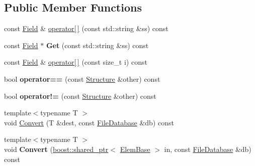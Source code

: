 \subsection*{Public Member Functions}
\begin{DoxyCompactItemize}
\item 
const \hyperlink{struct_assimp_1_1_blender_1_1_field}{Field} \& \hyperlink{class_assimp_1_1_blender_1_1_structure_ada31c77c46ca61b96be67c8c04a357d0}{operator\mbox{[}$\,$\mbox{]}} (const std\+::string \&ss) const 
\item 
\hypertarget{class_assimp_1_1_blender_1_1_structure_a884f54fe4c279088ab5fd2ff7d63a678}{const \hyperlink{struct_assimp_1_1_blender_1_1_field}{Field} $\ast$ {\bfseries Get} (const std\+::string \&ss) const }\label{class_assimp_1_1_blender_1_1_structure_a884f54fe4c279088ab5fd2ff7d63a678}

\item 
const \hyperlink{struct_assimp_1_1_blender_1_1_field}{Field} \& \hyperlink{class_assimp_1_1_blender_1_1_structure_a372b67e8fc1062502b3328b6fb40b91f}{operator\mbox{[}$\,$\mbox{]}} (const size\+\_\+t i) const 
\item 
\hypertarget{class_assimp_1_1_blender_1_1_structure_ad24eabf09c4852b6f46608803f3a1190}{bool {\bfseries operator==} (const \hyperlink{class_assimp_1_1_blender_1_1_structure}{Structure} \&other) const }\label{class_assimp_1_1_blender_1_1_structure_ad24eabf09c4852b6f46608803f3a1190}

\item 
\hypertarget{class_assimp_1_1_blender_1_1_structure_ad1070f2443a9f39c07aff22f46e5d661}{bool {\bfseries operator!=} (const \hyperlink{class_assimp_1_1_blender_1_1_structure}{Structure} \&other) const }\label{class_assimp_1_1_blender_1_1_structure_ad1070f2443a9f39c07aff22f46e5d661}

\item 
{\footnotesize template$<$typename T $>$ }\\void \hyperlink{class_assimp_1_1_blender_1_1_structure_aeb43c388379105fb957bed233acc88dd}{Convert} (T \&dest, const \hyperlink{class_assimp_1_1_blender_1_1_file_database}{File\+Database} \&db) const 
\item 
\hypertarget{class_assimp_1_1_blender_1_1_structure_a5f6d2e880135a00417031588f5340f4f}{{\footnotesize template$<$typename T $>$ }\\void {\bfseries Convert} (\hyperlink{classboost_1_1shared__ptr}{boost\+::shared\+\_\+ptr}$<$ \hyperlink{struct_assimp_1_1_blender_1_1_elem_base}{Elem\+Base} $>$ in, const \hyperlink{class_assimp_1_1_blender_1_1_file_database}{File\+Database} \&db) const }\label{class_assimp_1_1_blender_1_1_structure_a5f6d2e880135a00417031588f5340f4f}


\end{DoxyCompactItemize}
